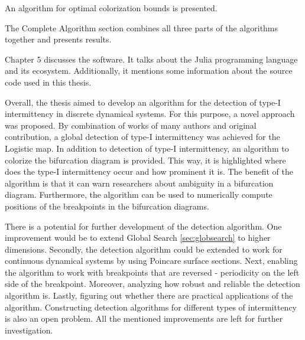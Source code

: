 An algorithm for optimal colorization bounds is presented.
\par
The Complete Algorithm section combines all three parts of the algorithms together and presents results.
\par
Chapter 5 discusses the software.
It talks about the Julia programming language and its ecosystem.
Additionally, it mentions some information about the source code used in this thesis.
\par
Overall, the thesis aimed to develop an algorithm for the detection of type-I intermittency in discrete dynamical systems.
For this purpose, a novel approach was proposed.
By combination of works of many authors and original contribution, a global detection of type-I intermittency was achieved for the Logistic map.
In addition to detection of type-I intermittency, an algorithm to colorize the bifurcation diagram is provided.
This way, it is highlighted where does the type-I intermittency occur and how prominent it is.
The benefit of the algorithm is that it can warn researchers about ambiguity in a bifurcation diagram. 
Furthermore, the algorithm can be used to numerically compute positions of the breakpoints in the bifurcation diagrams.
\par
There is a potential for further development of the detection algorithm.
One improvement would be to extend Global Search \ref{sec:globsearch} to higher dimensions.
Secondly, the detection algorithm could be extended to work for continuous dynamical systems by using Poincare surface sections.
Next, enabling the algorithm to work with breakpoints that are reversed - periodicity on the left side of the breakpoint.
Moreover, analyzing how robust and reliable the detection algorithm is.
Lastly, figuring out whether there are practical applications of the algorithm.
Constructing detection algorithms for different types of intermittency is also an open problem.
All the mentioned improvements are left for further investigation.

\endinput